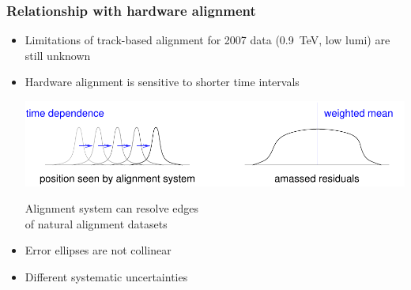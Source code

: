 \documentclass[compress]{beamer}
\begin{document}
\begin{frame}
  \frametitle{Relationship with hardware alignment}
  \begin{itemize}
    \item<1-> Limitations of track-based alignment for 2007 data (0.9~TeV,
      low lumi) are still unknown

    \item<2-> Hardware alignment is sensitive to shorter time intervals
      \begin{center}
	\includegraphics[width=0.85\linewidth]{time_peaks}
      \end{center}

       \mbox{\hspace{-0.3 cm}} Alignment system can resolve edges \\ \mbox{\hspace{-0.3 cm}} of natural alignment datasets

      \vspace{0.3 cm}
    \item<3-> Error ellipses are not collinear
    \item<3-> Different systematic uncertainties
  \end{itemize}

  \hfill \begin{minipage}{0.4\linewidth} \vspace{-2.8 cm}  \end{minipage}
\end{frame}
\end{document}

